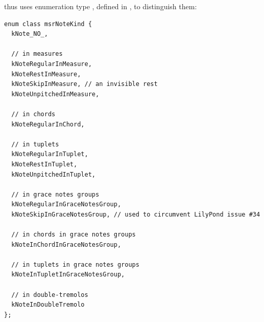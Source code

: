  thus uses enumeration type , defined in , to distinguish them:
\begin{lstlisting}[language=CPlusPlus]
enum class msrNoteKind {
  kNote_NO_,

  // in measures
  kNoteRegularInMeasure,
  kNoteRestInMeasure,
  kNoteSkipInMeasure, // an invisible rest
  kNoteUnpitchedInMeasure,

  // in chords
  kNoteRegularInChord,

  // in tuplets
  kNoteRegularInTuplet,
  kNoteRestInTuplet,
  kNoteUnpitchedInTuplet,

  // in grace notes groups
  kNoteRegularInGraceNotesGroup,
  kNoteSkipInGraceNotesGroup, // used to circumvent LilyPond issue #34

  // in chords in grace notes groups
  kNoteInChordInGraceNotesGroup,

  // in tuplets in grace notes groups
  kNoteInTupletInGraceNotesGroup,

  // in double-tremolos
  kNoteInDoubleTremolo
};
\end{lstlisting}


%
%
%
%
%
%
%
%
%
%


